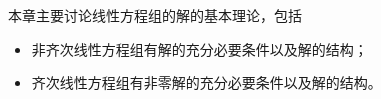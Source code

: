 \begin{frame}
  \begin{footnotesize}
    本章主要讨论线性方程组的解的基本理论，包括
    \begin{itemize}
      \item 非齐次线性方程组有解的充分必要条件以及解的结构；\\[0.2in]
      \item 齐次线性方程组有非零解的充分必要条件以及解的结构。
    \end{itemize}
  \end{footnotesize}
\end{frame}

